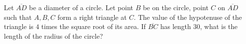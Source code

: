 Let $\overline{AD}$ be a diameter of a circle. Let point $B$ be on the circle, point $C$ on $\overline{AD}$ such that $A, B, C$ form a right triangle at $C$. The value of the hypotenuse of the triangle is $4$ times the square root of its area. If $\overline{BC}$ has length $30$,  what is the length of the radius of the circle?